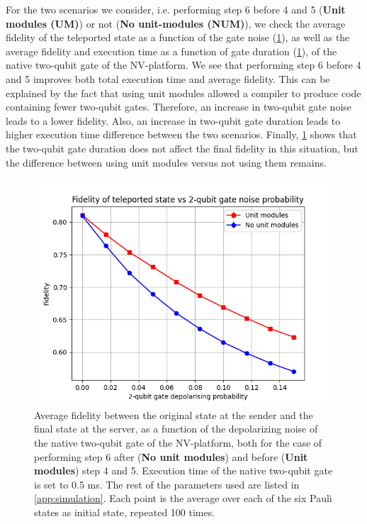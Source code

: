 For the two scenarios we consider, i.e. performing step 6 before 4 and 5 (\textbf{Unit modules (UM)}) or not (\textbf{No unit-modules (NUM)}), we check the average fidelity of the teleported state as a function of the gate noise (\cref{fig:sweep_gate_noise}), as well as the average fidelity and execution time as a function of gate duration (\cref{fig:sweep_gate_noise}), of the native two-qubit gate of the NV-platform. We see that performing step 6 before 4 and 5 improves both total execution time and average fidelity.
This can be explained by the fact that using unit modules allowed a compiler to produce \netqasm code containing fewer two-qubit gates.
Therefore, an increase in two-qubit gate noise leads to a lower fidelity.
Also, an increase in two-qubit gate duration leads to higher execution time difference between the two scenarios.
Finally, \cref{fig:sweep_gate_noise} shows that the two-qubit gate duration does not affect the final fidelity in this situation, but the difference between using unit modules versus not using them remains.


\begin{figure}
    \centering
    \includegraphics[scale=0.8]{figures/netqasm/plots/paper_teleport_sweep_gate_noise.png}
    \caption{
        Average fidelity between the original state at the sender and
        the final state at the server, as a function of the depolarizing noise
        of the native two-qubit gate of the NV-platform, both for the case of
        performing step 6 after (\textbf{No unit modules}) and before
        (\textbf{Unit modules}) step 4 and 5. Execution time of the native
        two-qubit gate is set to 0.5 ms. The rest of the parameters used are
        listed in \cref{app:simulation}. Each point is the average over each of
        the six Pauli states as initial state, repeated 100 times.}
    \label{fig:sweep_gate_noise}
\end{figure}

